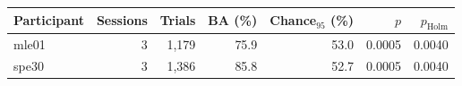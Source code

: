 \begin{tabular}{@{}lrrrrrr@{}}\toprule
Participant & Sessions & Trials & BA (\%) & Chance$_{95}$ (\%) & $p$ & $p_{\mathrm{Holm}}$\\\midrule
mle01 & 3 & 1,179 & 75.9 & 53.0 & 0.0005 & 0.0040\\
spe30 & 3 & 1,386 & 85.8 & 52.7 & 0.0005 & 0.0040\\
\bottomrule\end{tabular}
